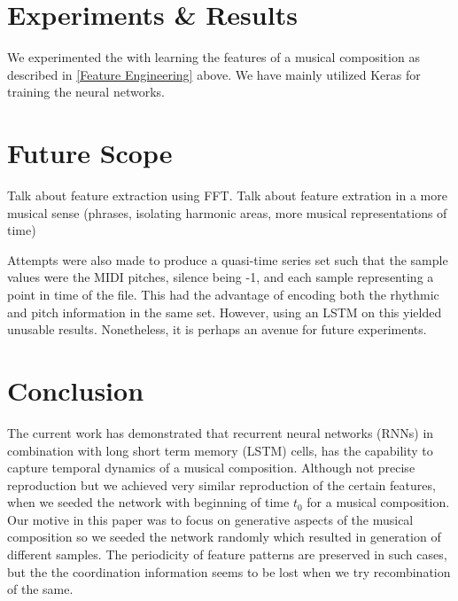 \documentclass[conference]{IEEEtran}
\begin{document}


\section{Experiments \& Results}
We experimented the with learning the features of a musical composition as described in \ref{Feature Engineering} above. We have mainly utilized Keras \cite{keras} for training the neural networks.

\section{Future Scope}
Talk about feature extraction using FFT. Talk about feature extration in a more musical sense (phrases, isolating harmonic areas, more musical representations of time)

Attempts were also made to produce a quasi-time series set such that the sample values were the MIDI pitches, silence being -1, and each sample representing a point in time of the file. This had the advantage of encoding both the rhythmic and pitch information in the same set. However, using an LSTM on this yielded unusable results. Nonetheless, it is perhaps an avenue for future experiments.

\section{Conclusion}
The current work has demonstrated that recurrent neural networks (RNNs) in combination with long short term memory (LSTM) cells, has the capability to capture temporal dynamics of a musical composition. Although not precise reproduction but we achieved very similar reproduction of the certain features, when we seeded the network with beginning of time $t_0$ for a musical composition. Our motive in this paper was to focus on generative aspects of the musical composition so we seeded the network randomly which resulted in generation of different samples. The periodicity of feature patterns are preserved in such cases, but the the coordination information seems to be lost when we try recombination of the same.\\
\end{document}
